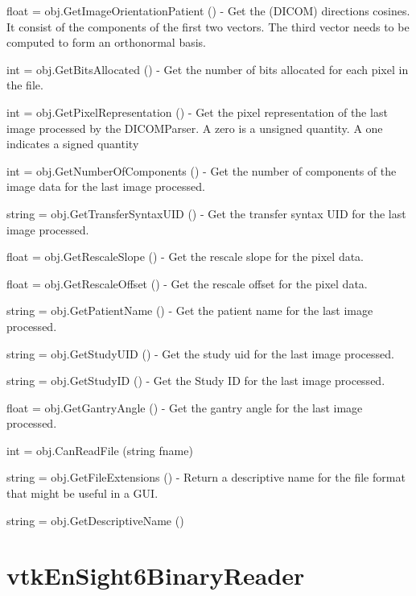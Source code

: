 \begin{DoxyItemize}
\item {\ttfamily float = obj.\-Get\-Image\-Orientation\-Patient ()} -\/ Get the (D\-I\-C\-O\-M) directions cosines. It consist of the components of the first two vectors. The third vector needs to be computed to form an orthonormal basis.  
\item {\ttfamily int = obj.\-Get\-Bits\-Allocated ()} -\/ Get the number of bits allocated for each pixel in the file.  
\item {\ttfamily int = obj.\-Get\-Pixel\-Representation ()} -\/ Get the pixel representation of the last image processed by the D\-I\-C\-O\-M\-Parser. A zero is a unsigned quantity. A one indicates a signed quantity  
\item {\ttfamily int = obj.\-Get\-Number\-Of\-Components ()} -\/ Get the number of components of the image data for the last image processed.  
\item {\ttfamily string = obj.\-Get\-Transfer\-Syntax\-U\-I\-D ()} -\/ Get the transfer syntax U\-I\-D for the last image processed.  
\item {\ttfamily float = obj.\-Get\-Rescale\-Slope ()} -\/ Get the rescale slope for the pixel data.  
\item {\ttfamily float = obj.\-Get\-Rescale\-Offset ()} -\/ Get the rescale offset for the pixel data.  
\item {\ttfamily string = obj.\-Get\-Patient\-Name ()} -\/ Get the patient name for the last image processed.  
\item {\ttfamily string = obj.\-Get\-Study\-U\-I\-D ()} -\/ Get the study uid for the last image processed.  
\item {\ttfamily string = obj.\-Get\-Study\-I\-D ()} -\/ Get the Study I\-D for the last image processed.  
\item {\ttfamily float = obj.\-Get\-Gantry\-Angle ()} -\/ Get the gantry angle for the last image processed.  
\item {\ttfamily int = obj.\-Can\-Read\-File (string fname)}  
\item {\ttfamily string = obj.\-Get\-File\-Extensions ()} -\/ Return a descriptive name for the file format that might be useful in a G\-U\-I.  
\item {\ttfamily string = obj.\-Get\-Descriptive\-Name ()}  
\end{DoxyItemize}\hypertarget{vtkio_vtkensight6binaryreader}{}\section{vtk\-En\-Sight6\-Binary\-Reader}\label{vtkio_vtkensight6binaryreader}
